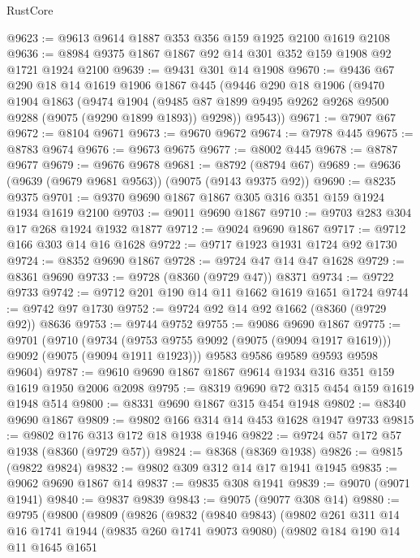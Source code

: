 \begin{lexlean}{RustCore}
\begin{coremodule}
@9623 := @9613 @9614 @1887 @353 @356 @159 @1925 @2100 @1619 @2108
@9636 := @8984 @9375 @1867 @1867 @92 @14 @301 @352 @159 @1908 @92 @1721 @1924 @2100
@9639 := @9431 @301 @14 @1908
@9670 := @9436
    @67
    @290
    @18
    @14
    @1619
    @1906
    @1867
    @445
    (@9446
      @290
      @18
      @1906
      (@9470
        @1904
        @1863
        (@9474
          @1904
          (@9485 @87 @1899 @9495 @9262 @9268 @9500 @9288 (@9075 (@9290 @1899 @1893)) @9298))
        @9543))
@9671 := @7907 @67
@9672 := @8104 @9671
@9673 := @9670 @9672
@9674 := @7978 @445
@9675 := @8783 @9674
@9676 := @9673 @9675
@9677 := @8002 @445
@9678 := @8787 @9677
@9679 := @9676 @9678
@9681 := @8792 (@8794 @67)
@9689 := @9636 (@9639 (@9679 @9681 @9563)) (@9075 (@9143 @9375 @92))
@9690 := @8235 @9375
@9701 := @9370 @9690 @1867 @1867 @305 @316 @351 @159 @1924 @1934 @1619 @2100
@9703 := @9011 @9690 @1867
@9710 := @9703 @283 @304 @17 @268 @1924 @1932 @1877
@9712 := @9024 @9690 @1867
@9717 := @9712 @166 @303 @14 @16 @1628
@9722 := @9717 @1923 @1931 @1724 @92 @1730
@9724 := @8352 @9690 @1867
@9728 := @9724 @47 @14 @47 @1628
@9729 := @8361 @9690
@9733 := @9728 (@8360 (@9729 @47)) @8371
@9734 := @9722 @9733
@9742 := @9712 @201 @190 @14 @11 @1662 @1619 @1651 @1724
@9744 := @9742 @97 @1730
@9752 := @9724 @92 @14 @92 @1662 (@8360 (@9729 @92)) @8636
@9753 := @9744 @9752
@9755 := @9086 @9690 @1867
@9775 := @9701
    (@9710
      (@9734 (@9753 @9755 @9092 (@9075 (@9094 @1917 @1619))) @9092 (@9075 (@9094 @1911 @1923)))
      @9583
      @9586
      @9589
      @9593
      @9598
      @9604)
@9787 := @9610 @9690 @1867 @1867 @9614 @1934 @316 @351 @159 @1619 @1950 @2006 @2098
@9795 := @8319 @9690 @72 @315 @454 @159 @1619 @1948 @514
@9800 := @8331 @9690 @1867 @315 @454 @1948
@9802 := @8340 @9690 @1867
@9809 := @9802 @166 @314 @14 @453 @1628 @1947 @9733
@9815 := @9802 @176 @313 @172 @18 @1938 @1946
@9822 := @9724 @57 @172 @57 @1938 (@8360 (@9729 @57))
@9824 := @8368 (@8369 @1938)
@9826 := @9815 (@9822 @9824)
@9832 := @9802 @309 @312 @14 @17 @1941 @1945
@9835 := @9062 @9690 @1867 @14
@9837 := @9835 @308 @1941
@9839 := @9070 (@9071 @1941)
@9840 := @9837 @9839
@9843 := @9075 (@9077 @308 @14)
@9880 := @9795
    (@9800
      (@9809
        (@9826
          (@9832
            (@9840 @9843)
            (@9802
              @261
              @311
              @14
              @16
              @1741
              @1944
              (@9835 @260 @1741 @9073 @9080)
              (@9802
                @184
                @190
                @14
                @11
                @1645
                @1651

\end{coremodule}
\end{lexlean}

